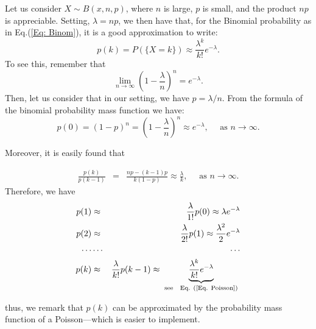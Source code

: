 \documentclass[smaller, handout]{beamer}\usepackage[]{graphicx}\usepackage[]{color}
\newcommand{\bea}{\begin{eqnarray}}
\newcommand{\eea}{\end{eqnarray}}
\newcommand{\nn}{\nonumber}
\begin{document}
\begin{frame}{\secname}%

Let us consider $X \sim B(x,n,p)$, \color{red} where $n$ is large, $p$ is small, and the product $np$ is appreciable\color{black}. Setting, $\lambda=np$, we
then have that, for the Binomial probability as in Eq.(\ref{Eq: Binom}), it is a good approximation to write:
$$
p(k) = P(\{X=k\}) \approx \frac{\lambda^k}{k!} e^{-\lambda}.
$$
To see this, remember that
$$
\lim_{n\rightarrow\infty} \left( 1- \frac{\lambda}{n} \right)^n = e^{-\lambda}.
$$
Then, let us consider that in our setting, we have $p=\lambda/n$. From the formula of the binomial probability mass function we have:
$$
p(0) = (1-p)^{n}=\left( 1- \frac{\lambda}{n} \right)^{n} \approx e^{-\lambda}, \quad \text{\ as \ \ } n\rightarrow\infty.
$$
\end{frame}%


\begin{frame}{\secname}%


Moreover, it is easily found that

\bea
\frac{p(k)}{p(k-1)} &=& \frac{np-(k-1)p}{k(1-p)} \approx \frac{\lambda}{k}, \quad \text{\ as \ \ } n\rightarrow\infty. \nn
\eea
Therefore, we have
\bea
p(1) &\approx& \frac{\lambda}{1!}p(0) \approx \lambda e^{-\lambda} \nn \\
p(2) &\approx& \frac{\lambda}{2!}p(1) \approx \frac{\lambda^2}{2} e^{-\lambda} \nn \\
\dotsm & \dotsm &  \dotsm  \nn \\
p(k) &\approx& \frac{\lambda}{k!}p(k-1) \approx \underbrace{\frac{\lambda^k}{k!} e^{-\lambda}}_{\text{\ see \ \ Eq. (\ref{Eq. Poisson})  }} \nn
\eea

thus, we remark that $p(k)$ can be approximated by the probability mass function of a Poisson---which is easier to implement.

\end{frame}%
\end{document}
